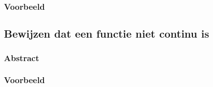 \documentclass[main.tex]{subfiles}
\begin{document}
\subsubsection{Voorbeeld}




\subsection{Bewijzen dat een functie niet continu is}
\subsubsection{Abstract}
\subsubsection{Voorbeeld}
\end{document}
